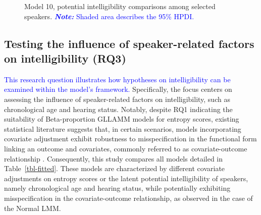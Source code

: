 \documentclass[
  authoryear,
  preprint,
  1p]{elsarticle}
\begin{document}
\label{cell-fig-si_contr_model10}
\begin{figure}[H]


\caption{\label{fig-si_contr_model10}Model 10, potential intelligibility
comparisons among selected speakers. \textcolor{blue}{\textbf{\emph{Note:}} Shaded area
describes the 95\% HPDI.}}

\end{figure}%

\subsection{Testing the influence of speaker-related factors on
intelligibility (RQ3)}\label{sec-R-RQ3}

\textcolor{blue}{This research question illustrates how hypotheses on intelligibility can
be examined within the model's framework.} Specifically, the focus
centers on assessing the influence of speaker-related factors on
intelligibility, such as chronological age and hearing status. Notably,
despite RQ1 indicating the suitability of Beta-proportion GLLAMM models
for entropy scores, existing statistical literature suggests that, in
certain scenarios, models incorporating covariate adjustment exhibit
robustness to misspecification in the functional form linking an outcome
and covariates, commonly referred to as covariate-outcome relationship
\citep{Tackney_et_al_2023}. Consequently, this study compares all models
detailed in Table~\ref{tbl-fitted}. These models are characterized by
different covariate adjustments on entropy scores or the latent
potential intelligibility of speakers, namely chronological age and
hearing status, while potentially exhibiting misspecification in the
covariate-outcome relationship, as observed in the case of the Normal
LMM.
\end{document}
